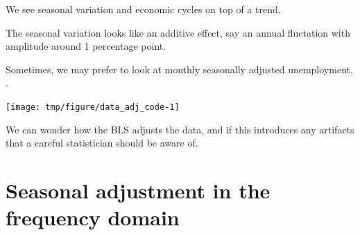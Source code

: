 \begin{frame}[fragile]

\vspace{-3mm}

\bi
\item We see seasonal variation and economic cycles on top of a trend.

\item The seasonal variation looks like an additive effect, say an annual fluctation with amplitude around 1 percentage point. 

\item Sometimes, we may prefer to look at monthly seasonally adjusted unemployment, .
\ei

\vspace{-2mm}

\begin{knitrout}\small
{}\color{fgcolor}\begin{kframe}
\begin{alltt}
 \hlkwb{<-} \hlstd{(}\hlstd{=}\hlstd{,}\hlstd{=}\hlstd{,}
  \hlstd{=}\hlstd{)}
 \hlkwb{<-} \hlstd{(}\hlstd{(U2[}\hlopt{:}\hlstd{]))}
\end{alltt}
\end{kframe}
\end{knitrout}

\vspace{-4mm}

\begin{knitrout}\small
{}\color{fgcolor}

{\centering \texttt{[image: tmp/figure/data\_adj\_code-1]} 

}


\end{knitrout}

\vspace{-2mm}

\bi
\item
We can wonder how the BLS adjusts the data, and if this introduces any artifacts that a careful statistician should be aware of.
\ei
\end{frame}


\section{Seasonal adjustment in the frequency domain}

